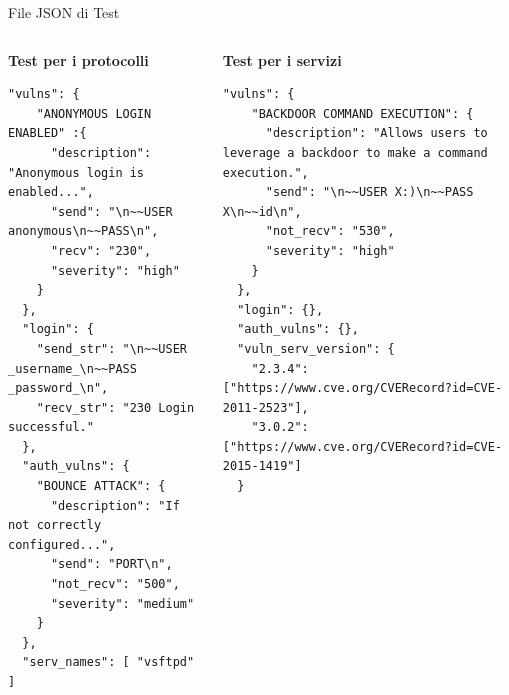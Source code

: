 \begin{frame}[fragile]{File JSON di Test}
\begin{columns}
\begin{column}{0.5\textwidth}
\centering
\textbf{Test per i protocolli}
\begin{lstlisting}[style=statale, basicstyle=\tiny]
  "vulns": {
    "ANONYMOUS LOGIN ENABLED" :{
      "description": "Anonymous login is enabled...",
      "send": "\n~~USER anonymous\n~~PASS\n",
      "recv": "230",
      "severity": "high"
    }
  },
  "login": {
    "send_str": "\n~~USER _username_\n~~PASS _password_\n",
    "recv_str": "230 Login successful."
  },
  "auth_vulns": {
    "BOUNCE ATTACK": {
      "description": "If not correctly configured...",
      "send": "PORT\n",
      "not_recv": "500",
      "severity": "medium"
    }
  },
  "serv_names": [ "vsftpd" ]
\end{lstlisting}
\end{column}
\begin{column}{0.5\textwidth}
\centering
\textbf{Test per i servizi}
\begin{lstlisting}[style=statale, basicstyle=\tiny]
  "vulns": {
    "BACKDOOR COMMAND EXECUTION": {
      "description": "Allows users to leverage a backdoor to make a command execution.",
      "send": "\n~~USER X:)\n~~PASS X\n~~id\n",
      "not_recv": "530",
      "severity": "high"
    }
  },
  "login": {},
  "auth_vulns": {},
  "vuln_serv_version": {
    "2.3.4": ["https://www.cve.org/CVERecord?id=CVE-2011-2523"],
    "3.0.2": ["https://www.cve.org/CVERecord?id=CVE-2015-1419"]
  }
\end{lstlisting}
\end{column}
\end{columns}
\end{frame}


